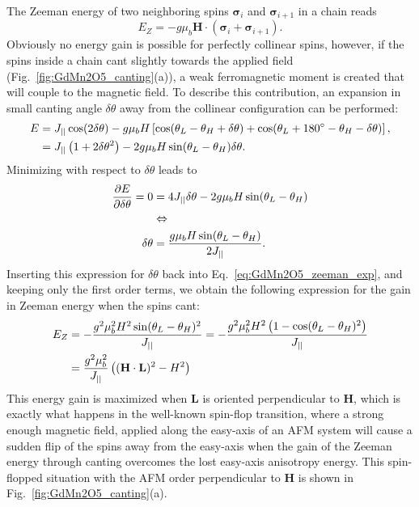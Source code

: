 The Zeeman energy of two neighboring spins $\pmb{\sigma}_{i}$ and $\pmb{\sigma}_{i+1}$ in a chain reads
\begin{equation}
	E_Z = -g \mu_b \mathbf{H} \cdot (\pmb{\sigma}_i + \pmb{\sigma}_{i+1})\nonumber.
\end{equation}
Obviously no energy gain is possible for perfectly collinear spins, however, if the spins inside a chain cant slightly towards the applied field (Fig.~\ref{fig:GdMn2O5_canting}(a)), a weak ferromagnetic moment is created that will couple to the magnetic field.
To describe this contribution, an expansion in small canting angle $\delta \theta$ away from the collinear configuration can be performed:
\begin{align}
	E &= J_{||} \cos(2\delta \theta) - g \mu_b H \left[\cos(\theta_L - \theta_H + \delta \theta) + \cos(\theta_L + 180^\circ - \theta_H - \delta \theta)\right],\nonumber\\
	&= J_{||} \left( 1+2\delta\theta^2 \right) - 2 g \mu_b H \sin(\theta_L - \theta_H)\delta\theta \label{eq:GdMn2O5_zeeman_exp}.
\end{align}
Minimizing with respect to $\delta \theta$ leads to
\begin{align}
	\frac{\partial E}{\partial \delta \theta} = 0 &= 4 J_{||} \delta \theta - 2 g \mu_b H \sin(\theta_L - \theta_H) \nonumber\\
	&\Leftrightarrow \nonumber\\
	\delta \theta &= \frac{g\mu_b H \sin(\theta_L - \theta_H)}{2 J_{||}}.\nonumber
\end{align}
Inserting this expression for $\delta \theta$ back into Eq.~\ref{eq:GdMn2O5_zeeman_exp}, and keeping only the first order terms, we obtain the following expression for the gain in Zeeman energy when the spins cant:
\begin{align}
	E_Z &= -\frac{g^2\mu_b^2 H^2 \sin(\theta_L - \theta_H)^2}{J_{||}} = -\frac{g^2\mu_b^2 H^2 \left(1 - \cos(\theta_L - \theta_H)^2\right)}{J_{||}} \nonumber\\
	&=\frac{g^2\mu_b^2}{J_{||}}\left((\mathbf{H}\cdot\mathbf{L})^2 - H^2\right)\nonumber
\end{align}
This energy gain is maximized when $\mathbf{L}$ is oriented perpendicular to $\mathbf{H}$, which is exactly what happens in the well-known spin-flop transition, where a strong enough magnetic field, applied along the easy-axis of an AFM system will cause a sudden flip of the spins away from the easy-axis when the gain of the Zeeman energy through canting overcomes the lost easy-axis anisotropy energy. This spin-flopped situation with the AFM order perpendicular to $\mathbf{H}$ is shown in Fig.~\ref{fig:GdMn2O5_canting}(a).

